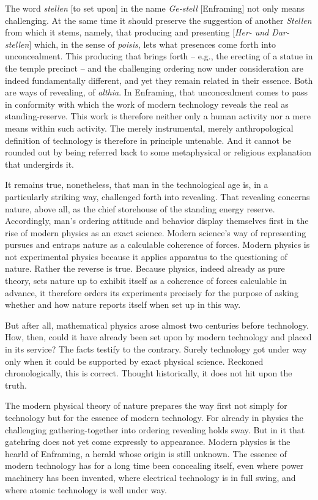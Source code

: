 The word \textit{stellen} [to set upon] in the name \textit{Ge-stell} [Enframing] not only means challenging. At the same time it should preserve the suggestion of another \textit{Stellen} from which it stems, namely, that producing and presenting [\textit{Her- und Dar-stellen}] which, in the sense of \textit{poisis}, lets what presences come forth into unconcealment. This producing that brings forth -- e.g., the erecting of a statue in the temple precinct -- and the challenging ordering now under consideration are indeed fundamentally different, and yet they remain related in their essence. Both are ways of revealing, of \textit{althia}. In Enframing, that unconcealment comes to pass in conformity with which the work of modern technology reveals the real as standing-reserve. This work is therefore neither only a human activity nor a mere means within such activity. The merely instrumental, merely anthropological definition of technology is therefore in principle untenable. And it cannot be rounded out by being referred back to some metaphysical or religious explanation that undergirds it.

It remains true, nonetheless, that man in the technological age is, in a particularly striking way, challenged forth into revealing. That revealing concerns nature, above all, as the chief storehouse of the standing energy reserve. Accordingly, man's ordering attitude and behavior display themselves first in the rise of modern physics as an exact science. Modern science's way of representing pursues and entraps nature as a calculable coherence of forces. Modern physics is not experimental physics because it applies apparatus to the questioning of nature. Rather the reverse is true. Because physics, indeed already as pure theory, sets nature up to exhibit itself as a coherence of forces calculable in advance, it therefore orders its experiments precisely for the purpose of asking whether and how nature reports itself when set up in this way.

But after all, mathematical physics arose almost two centuries before technology. How, then, could it have already been set upon by modern technology and placed in its service? The facts testify to the contrary. Surely technology got under way only when it could be supported by exact physical science. Reckoned chronologically, this is correct. Thought historically, it does not hit upon the truth.

The modern physical theory of nature prepares the way first not simply for technology but for the essence of modern technology. For already in physics the challenging gathering-together into ordering revealing holds sway. But in it that gatehring does not yet come expressly to appearance. Modern physics is the hearld of Enframing, a herald whose origin is still unknown. The essence of modern technology has for a long time been concealing itself, even where power machinery has been invented, where electrical technology is in full swing, and where atomic technology is well under way.

